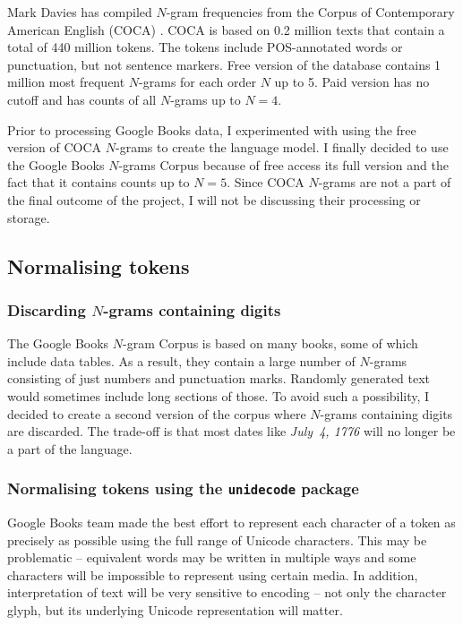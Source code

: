 \documentclass[draft]{IIBproject}
\begin{document}
Mark Davies has compiled $N$-gram frequencies \cite{web:byu_ngrams} from the Corpus of Contemporary American English (COCA) \cite{coca2010}. COCA is based on 0.2 million texts that contain a total of 440 million tokens. The tokens include POS-annotated words or punctuation, but not sentence markers. Free version of the database contains 1 million most frequent $N$-grams for each order $N$ up to 5. Paid version has no cutoff and has counts of all $N$-grams up to $N=4$.

Prior to processing Google Books data, I experimented with using the free version of COCA $N$-grams to create the language model. I finally decided to use the Google Books $N$-grams Corpus because of free access its full version and the fact that it contains counts up to $N=5$. Since COCA $N$-grams are not a part of the final outcome of the project, I will not be discussing their processing or storage.

\FloatBarrier
\subsection{Normalising tokens}

\subsubsection{Discarding $N$-grams containing digits}

The Google Books $N$-gram Corpus is based on many books, some of which include data tables. As a result, they contain a large number of $N$-grams consisting of just numbers and punctuation marks. Randomly generated text would sometimes include long sections of those. To avoid such a possibility, I decided to create a second version of the corpus where $N$-grams containing digits are discarded. The trade-off is that most dates like \emph{July~4, 1776} will no longer be a part of the language.

\subsubsection{Normalising tokens using the \texttt{unidecode} package}
\label{sec:normalising_tokens}

Google Books team made the best effort to represent each character of a token as precisely as possible using the full range of Unicode characters. This may be problematic -- equivalent words may be written in multiple ways and some characters will be impossible to represent using certain media. In addition, interpretation of text will be very sensitive to encoding -- not only the character glyph, but its underlying Unicode representation will matter.
\end{document}
